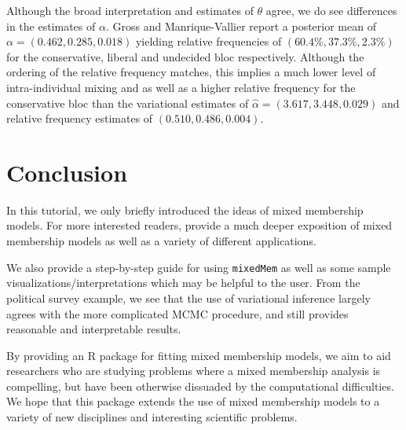 \documentclass{article}\usepackage[]{graphicx}\usepackage[]{color}
\begin{document}
Although the broad interpretation and estimates of $\theta$ agree, we do see differences in the estimates of $\alpha$. Gross and Manrique-Vallier report a posterior mean of $\alpha = \left(0.462, 0.285, 0.01 8\right)$ yielding relative frequencies of $\left(60.4\%, 37.3\%, 2.3\%\right)$ for the conservative, liberal and undecided bloc respectively. Although the ordering of the relative frequency matches, this implies a much lower level of intra-individual mixing and as well as a higher relative frequency for the conservative bloc than the variational estimates of $\hat \alpha= \left(3.617, 3.448, 0.029 \right)$ and relative frequency estimates of $\left(0.510, 0.486, 0.004\right)$.

\section{Conclusion}
In this tutorial, we only briefly introduced the ideas of mixed membership models. For more interested readers, \cite{Airoldi2014Handbook} provide a much deeper exposition of mixed membership models as well as a variety of different applications. 

We also provide a step-by-step guide for using \texttt{mixedMem} as well as some sample visualizations/interpretations which may be helpful to the user. From the political survey example, we see that the use of variational inference largely agrees with the more complicated MCMC procedure, and still provides reasonable and interpretable results.

By providing an R package for fitting mixed membership models, we aim to aid researchers who are studying problems where a mixed membership analysis is compelling, but have been otherwise dissuaded by the computational difficulties. We hope that this package extends the use of mixed membership models to a variety of new disciplines and interesting scientific problems.



\end{document}
